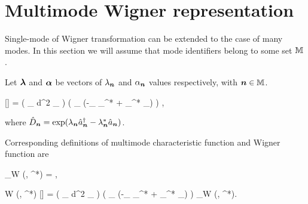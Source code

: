 \section{Multimode Wigner representation}


Single-mode  of Wigner transformation can be extended to the case of many modes.
In this section we will assume that mode identifiers belong to some set $\mathbb{M}$ .

\begin{definition}
\label{def:formalism:mm-wigner:w-transformation}
	Let $\boldsymbol{\lambda}$ and $\boldsymbol{\alpha}$ be vectors of $\lambda_{\boldsymbol{n}}$ and $\alpha_{\boldsymbol{n}}$ values respectively,
	with $\boldsymbol{n} \in \mathbb{M}$.
	\begin{eqn*}
		[]
		= 
			\left( \prod_{\nvec \in \restbasis} \int d^2 \lambda_{\nvec} \right)
			\left(
				\prod_{\nvec \in \restbasis} \exp(-\lambda_{\nvec} \alpha_{\nvec}^* + \lambda_{\nvec}^* \alpha_{\nvec})
			\right)
			\Trace{
				\hat{A}
				\prod_{\nvec \in \restbasis} \hat{D}_{\nvec} (\lambda_{\nvec}, \lambda_{\nvec}^*)
			},
	\end{eqn*}
	where $\hat{D}_{\boldsymbol{n}} = \exp(\lambda_{\boldsymbol{n}} \hat{a}_{\boldsymbol{n}}^\dagger - \lambda_{\boldsymbol{n}}^* \hat{a}_{\boldsymbol{n}})$.
\end{definition}

Corresponding definitions of multimode characteristic function and Wigner function are

\begin{definition}
\label{def:formalism:mm-wigner:w-definition}
	\begin{eqn*}
		\chi_W (\blambda, \blambda^*)
		= \Trace{
			\hat{\rho}
			\prod_{\nvec \in \restbasis} \hat{D}_{\nvec} (\lambda_{\nvec}, \lambda_{\nvec}^*)
		},
	\end{eqn*}
	\begin{eqn*}
		W (\balpha, \balpha^*)
		\equiv {}[\hat{\rho}]
		= \frac{1}{\pi^{2|\restbasis|}}
			\left( \prod_{\nvec \in \restbasis} \int d^2 \lambda_{\nvec} \right)
			\left(
				\prod_{\nvec \in \restbasis}
				\exp(-\lambda_{\nvec} \alpha_{\nvec}^* + \lambda_{\nvec}^* \alpha_{\nvec})
			\right)
			\chi_W (\blambda, \blambda^*).
	\end{eqn*}
\end{definition}

